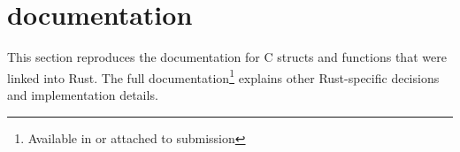 \chapter{ documentation}\label{appx:docs:rustcherilib}
This section reproduces the documentation for  C structs and functions that were linked into Rust.
The full documentation\footnote{Available in  or attached to submission} explains other Rust-specific decisions and implementation details.


